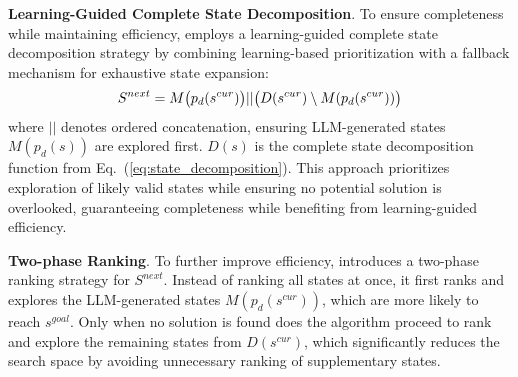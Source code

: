 \noindent \textbf{Learning-Guided Complete State Decomposition}. To ensure completeness while maintaining efficiency, \cmethod employs a learning-guided complete state decomposition strategy by combining learning-based prioritization with a fallback mechanism for exhaustive state expansion:
\begin{equation}
\small
{S}^{next} = M\big(p_d(s^{cur})\big) || \big(D(s^{cur})\setminus M(p_d(s^{cur}))\big)
\end{equation}
where $||$ denotes ordered concatenation, ensuring LLM-generated states $M(p_{{d}}(s))$ are explored first. $D(s)$ is the complete state decomposition function from Eq.~(\ref{eq:state_decomposition}). 
This approach prioritizes exploration of likely valid states while ensuring no potential solution is overlooked, guaranteeing completeness while benefiting from learning-guided efficiency.

\noindent \textbf{Two-phase Ranking}. 
To further improve efficiency, \cmethod{} introduces a two-phase ranking strategy for $S^{next}$. Instead of ranking all states at once, it first ranks and explores the LLM-generated states $M(p_d(s^{cur}))$, which are more likely to reach $s^{goal}$. Only when no solution is found does the algorithm proceed to rank and explore the remaining states from $D(s^{cur})$, which significantly reduces the search space by avoiding unnecessary ranking of supplementary states.


